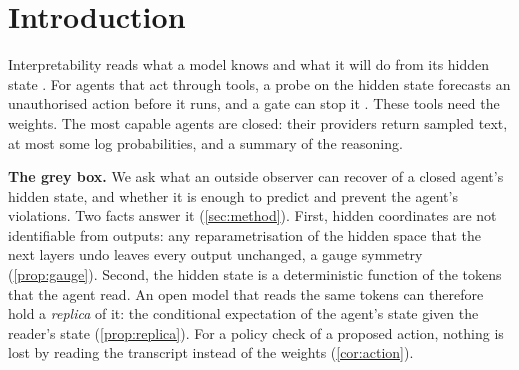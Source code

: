 \documentclass{article}
\theoremstyle{plain}
\theoremstyle{definition}
\begin{document}
\section{Introduction}
\label{sec:intro}
Interpretability reads what a model knows and what it will do from its hidden state \citep{burns2023ccs,marks2023geometry,zou2023repe,arditi2024refusal,goldowskydill2025probes}.
For agents that act through tools, a probe on the hidden state forecasts an unauthorised action before it runs, and a gate can stop it \citep{fayyazi2026cape}.
These tools need the weights. The most capable agents are closed: their providers return sampled text, at most some log probabilities, and a summary of the reasoning.

\textbf{The grey box.} We ask what an outside observer can recover of a closed agent's hidden state, and whether it is enough to predict and prevent the agent's violations. Two facts answer it (\cref{sec:method}). First, hidden coordinates are not identifiable from outputs: any reparametrisation of the hidden space that the next layers undo leaves every output unchanged, a gauge symmetry (\cref{prop:gauge}). Second, the hidden state is a deterministic function of the tokens that the agent read. An open model that reads the same tokens can therefore hold a \emph{replica} of it: the conditional expectation of the agent's state given the reader's state (\cref{prop:replica}). For a policy check of a proposed action, nothing is lost by reading the transcript instead of the weights (\cref{cor:action}).
\end{document}
